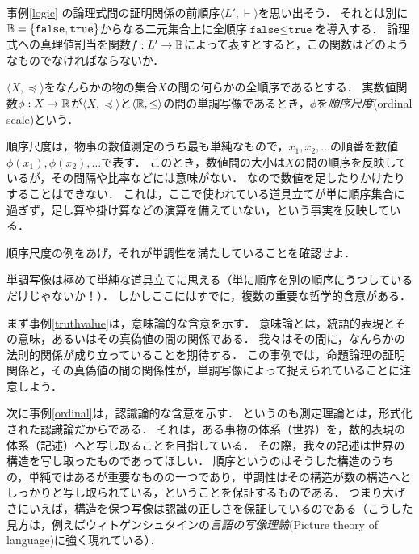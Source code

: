 \documentclass[dvipdfmx,11pt,a4paper]{jsarticle}
\begin{document}
\begin{example}[真理値関数] \label{truthvalue}
事例\ref{logic} の論理式間の証明関係の前順序$\langle L', \vdash \rangle$を思い出そう．
それとは別に$\mathbb{B} = \{ \texttt{false}, \texttt{true} \}$からなる二元集合上に全順序$\texttt{false} \leq \texttt{true}$を導入する．
論理式への真理値割当を関数$f:L' \to \mathbb{B}$によって表すとすると，この関数はどのようなものでなければならないか．
\end{example}

\begin{example}[測定理論] \label{ordinal}
$\langle X, \preceq \rangle$をなんらかの物の集合$X$の間の何らかの全順序であるとする．
実数値関数$\phi:X \to \mathbb{R}$が$\langle X, \preceq \rangle$と$\langle \mathbb{R}, \leq \rangle$の間の単調写像であるとき，$\phi$を\emph{順序尺度}(ordinal scale)という．

順序尺度は，物事の数値測定のうち最も単純なもので，$x_1, x_2, \dots$の順番を数値$\phi(x_1), \phi(x_2), \dots$で表す．
このとき，数値間の大小は$X$の間の順序を反映しているが，その間隔や比率などには意味がない．
なので数値を足したりかけたりすることはできない．
これは，ここで使われている道具立てが単に順序集合に過ぎず，足し算や掛け算などの演算を備えていない，という事実を反映している．
\end{example}

\begin{exercise}
 順序尺度の例をあげ，それが単調性を満たしていることを確認せよ．
\end{exercise}

単調写像は極めて単純な道具立てに思える（単に順序を別の順序にうつしているだけじゃないか！）．
しかしここにはすでに，複数の重要な哲学的含意がある．

まず事例\ref{truthvalue}は，意味論的な含意を示す．
意味論とは，統語的表現とその意味，あるいはその真偽値の間の関係である．
我々はその間に，なんらかの法則的関係が成り立っていることを期待する．
この事例では，命題論理の証明関係と，その真偽値の間の関係性が，単調写像によって捉えられていることに注意しよう．

次に事例\ref{ordinal}は，認識論的な含意を示す．
というのも測定理論とは，形式化された認識論だからである．
それは，ある事物の体系（世界）を，数的表現の体系（記述）へと写し取ることを目指している．
その際，我々の記述は世界の構造を写し取ったものであってほしい．
順序というのはそうした構造のうちの，単純ではあるが重要なものの一つであり，単調性はその構造が数の構造へとしっかりと写し取られている，ということを保証するものである．
つまり大げさにいえば，構造を保つ写像は認識の正しさを保証しているのである（こうした見方は，例えばウィトゲンシュタインの\emph{言語の写像理論}(Picture theory of language)に強く現れている）．
\end{document}
